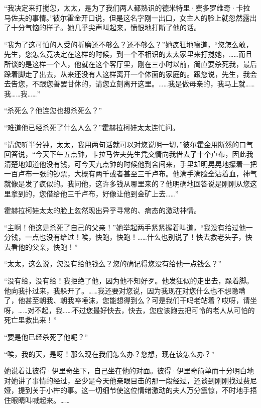 \par “我决定来打搅您，太太，是为了我们两人都熟识的德米特里·费多罗维奇·卡拉马佐夫的事情。”彼尔霍金开口说，但是这名字刚一出口，女主人的脸上就忽然露出了十分气恼的样子。她几乎尖声叫起来，愤恨地打断了他的话。
\par “我为了这可怕的人受的折磨还不够么？还不够么？”她疯狂地嚷道，“您怎么敢，先生，您怎么竟决定在这样的时候，到一个不相识的太太家里来打搅她，……而且所谈的是这样一个人，他就在这个客厅里，刚在三小时以前，简直要杀死我，最后跺着脚走了出去，从来还没有人这样离开一个体面的家庭的。跟您说，先生，我会去告您，不跟您善罢甘休的，请您立刻离开这里。……我是做母亲的，我马上就……我……我……”
\par “杀死么？他连您也想杀死么？”
\par “难道他已经杀死了什么人么？”霍赫拉柯娃太太连忙问。
\par “请您听半分钟，太太，我用两句话就可以对您说明一切，”彼尔霍金用断然的口气回答说，“今天下午五点钟，卡拉马佐夫先生凭交情向我借去了十个卢布，因此我清楚地知道他没有钱，可今天九点钟的时候他到舍间来，手里却明晃晃地攥着一把一百卢布一张的钞票，大概有两千或者甚至三千卢布。他满手满脸全沾着血，神气就像是发了疯似的。我问他，这许多钱从哪里来的？他明确地回答说是刚刚从您这里拿到的，您借给他三千卢布，好像让他到金矿上去……”
\par 霍赫拉柯娃太太的脸上忽然现出异乎寻常的、病态的激动神情。
\par “主啊！他这是杀死了自己的父亲！”她举起两手紧紧握着叫道，“我没有给过他一分钱，一点也没有给过！唉，快跑，快跑！……什么也别说了！快去救老头子，快去看他的父亲，快跑！”
\par “太太，这么说，您没有给他钱么？您的确记得您没有给他一点钱么？”
\par “没有给，没有给！我拒绝了他，因为他不知好歹。他发狂似的走出去，跺着脚。他向我扑过来，我躲开了。……我还要对您说，因为我现在对您什么也不想隐瞒了，他甚至朝我、朝我啐唾沫，您能想得到么？可是我们干吗老站着？哎呀，请坐呀，……对不起，我……不过您最好快去，快去，您应该跑去把可怜的老人从可怕的死亡里救出来！”
\par “要是他已经杀死了他呢？”
\par “唉，我的天，是呀！那么现在我们怎么办？您想，现在该怎么办？”
\par 她说着让彼得·伊里奇坐下，自己坐在他的对面。彼得·伊里奇简单而十分明白地对她讲了事情的经过，至少是今天他亲眼目击的那一段经过，还谈到刚刚找过费尼娅，提到关于小杵的事。这一切细节使这位情绪激动的夫人万分震惊，不时地手捂住眼睛叫喊起来。……
